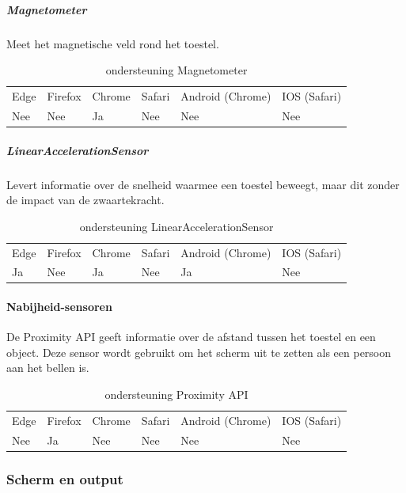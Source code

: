 	\subparagraph{Magnetometer }
			Meet het magnetische veld rond het toestel. 
			
		\begin{table}[H]
			\centering
			\begin{tabular}{llllll}
				Edge & Firefox & Chrome & Safari & Android (Chrome) & IOS (Safari) \\
				Nee   & Nee      &  Ja   & Nee     & Nee               & Nee          
			\end{tabular}	
			\caption{ondersteuning Magnetometer  }
			\label{ondersteuning Magnetometer   }
		\end{table}
			
			
	\subparagraph{LinearAccelerationSensor    }
		Levert informatie over de snelheid waarmee een toestel beweegt, maar dit zonder de impact van de zwaartekracht.
			
		\begin{table}[H]
			\centering
			\begin{tabular}{llllll}
				Edge & Firefox & Chrome & Safari & Android (Chrome) & IOS (Safari) \\
				Ja   & Nee      &  Ja   & Nee     & Ja               & Nee          
			\end{tabular}	
			\caption{ondersteuning 	LinearAccelerationSensor   }
			\label{ondersteuning LinearAccelerationSensor    }
		\end{table}
		
			
\paragraph{Nabijheid-sensoren }
De Proximity API \autocite{Kostiainen2020a} geeft informatie over de afstand tussen het toestel en een object. Deze sensor wordt gebruikt om het scherm uit te zetten als een persoon aan het bellen is.

\begin{table}[H]
	\centering
	\begin{tabular}{llllll}
		Edge & Firefox & Chrome & Safari & Android (Chrome) & IOS (Safari) \\
		Nee   & Ja      &  Nee   & Nee     & Nee               & Nee          
	\end{tabular}	
	\caption{ondersteuning  Proximity API  }
	\label{ondersteuning  Proximity API }
\end{table}



\subsubsection{Scherm en output}
